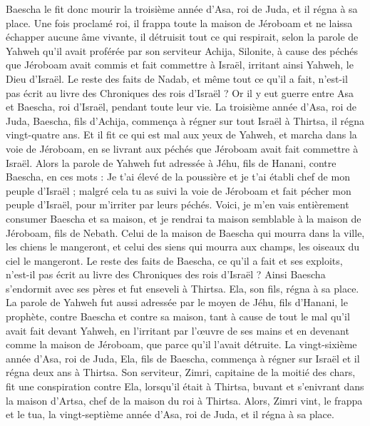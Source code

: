 \begin{multicols}{2}
Baescha le fit donc mourir la troisième année d'Asa, roi de Juda, et il régna à sa place.
Une fois proclamé roi, il frappa toute la maison de Jéroboam et ne laissa échapper aucune âme vivante, il détruisit tout ce qui respirait, selon la parole de Yahweh qu'il avait proférée par son serviteur Achija, Silonite,
à cause des péchés que Jéroboam avait commis et fait commettre à Israël, irritant ainsi Yahweh, le Dieu d'Israël.
Le reste des faits de Nadab, et même tout ce qu'il a fait, n'est-il pas écrit au livre des Chroniques des rois d'Israël ?
Or il y eut guerre entre Asa et Baescha, roi d'Israël, pendant toute leur vie.
La troisième année d'Asa, roi de Juda, Baescha, fils d'Achija, commença à régner sur tout Israël à Thirtsa, il régna vingt-quatre ans.
Et il fit ce qui est mal aux yeux de Yahweh, et marcha dans la voie de Jéroboam, en se livrant aux péchés que Jéroboam avait fait commettre à Israël.
\VerseOne{}Alors la parole de Yahweh fut adressée à Jéhu, fils de Hanani, contre Baescha, en ces mots :
Je t'ai élevé de la poussière et je t'ai établi chef de mon peuple d'Israël ; malgré cela tu as suivi la voie de Jéroboam et fait pécher mon peuple d'Israël, pour m'irriter par leurs péchés.
Voici, je m'en vais entièrement consumer Baescha et sa maison, et je rendrai ta maison semblable à la maison de Jéroboam, fils de Nebath.
Celui de la maison de Baescha qui mourra dans la ville, les chiens le mangeront, et celui des siens qui mourra aux champs, les oiseaux du ciel le mangeront.
Le reste des faits de Baescha, ce qu'il a fait et ses exploits, n'est-il pas écrit au livre des Chroniques des rois d'Israël ?
Ainsi Baescha s'endormit avec ses pères et fut enseveli à Thirtsa. Ela, son fils, régna à sa place.
La parole de Yahweh fut aussi adressée par le moyen de Jéhu, fils d'Hanani, le prophète, contre Baescha et contre sa maison, tant à cause de tout le mal qu'il avait fait devant Yahweh, en l'irritant par l'œuvre de ses mains et en devenant comme la maison de Jéroboam, que parce qu'il l'avait détruite.
La vingt-sixième année d'Asa, roi de Juda, Ela, fils de Baescha, commença à régner sur Israël et il régna deux ans à Thirtsa.
Son serviteur, Zimri, capitaine de la moitié des chars, fit une conspiration contre Ela, lorsqu'il était à Thirtsa, buvant et s'enivrant dans la maison d'Artsa, chef de la maison du roi à Thirtsa.
Alors, Zimri vint, le frappa et le tua, la vingt-septième année d'Asa, roi de Juda, et il régna à sa place.

\end{multicols}
